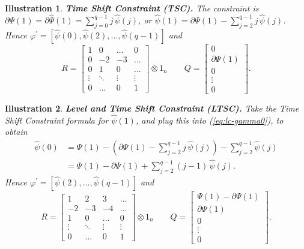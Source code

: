 \documentclass[a4paper]{book}
\newtheorem{Illustration}{Illustration}
\begin{document}
 
\begin{Illustration}  {\bf Time Shift Constraint (TSC).}   \rm
\label{ill:tsc}
   The constraint is $\partial {\Psi} (1) = \partial \widehat{\Psi} (1)
   = \sum_{j=0}^{q-1} j \, \widehat{\psi} (j)$,
 or $\widehat{\psi} (1)  = \partial {\Psi} (1)  -  \sum_{j=2}^{q-1} j \, \widehat{\psi} (j) $.
 Hence  $ \varphi^{\prime}  = [ \widehat{\psi} (0), \widehat{\psi} (2), \ldots, \widehat{\psi} (q-1) ] $ and
\[
	R  = \left[ \begin{array}{cccc} 1 & 0 &  \ldots &  0  \\  0 & -2  &  -3  & \ldots  \\
		0 & 1 & 0 & \ldots \\ 
		\vdots & \ddots & \vdots & \vdots \\ 0 & \ldots & 0 & 1 \end{array} \right] \otimes 1_n \qquad
	Q = \left[ \begin{array}{c} 0 \\ \partial {\Psi} (1) \\ 0 \\ \vdots \\ 0 \end{array} \right].
\]
\end{Illustration}
 
 
\begin{Illustration}  {\bf Level and Time Shift Constraint (LTSC).}  \rm
\label{ill:ltsc}
   Take the Time Shift Constraint formula for $\widehat{\psi} (1)$,
 and plug this into (\ref{eq:lc-gamma0}), to obtain
\begin{align*}
 \widehat{\psi} (0)  & = \Psi (1) - \left( \partial {\Psi} (1)  -  \sum_{j=2}^{q-1} j  \, \widehat{\psi} (j) \right) -  \sum_{j=2}^{q-1} 
 \widehat{\psi} (j)  \\
	& = \Psi (1) -  \partial {\Psi} (1)  +  \sum_{j=2}^{q-1} (j-1)  \, \widehat{\psi} (j).
\end{align*}
 Hence  $ \varphi^{\prime}  = [  \widehat{\psi} (2), \ldots, \widehat{\psi} (q-1)  ] $ and
\[
	R  = \left[ \begin{array}{cccc} 1 & 2  &  3  &   \ldots    \\  -2  & -3  &  -4  & \ldots  \\
		 1  & 0 & \ldots & 0 \\ 
		\vdots & \ddots & \vdots & \vdots \\ 0 & \ldots & 0 & 1 \end{array} \right]  \otimes 1_n \qquad
	Q = \left[ \begin{array}{c} \Psi (1) - \partial {\Psi} (1)  \\  \partial {\Psi} (1) \\ 0 \\ \vdots \\ 0 \end{array} \right].
\]
\end{Illustration}
\end{document}
